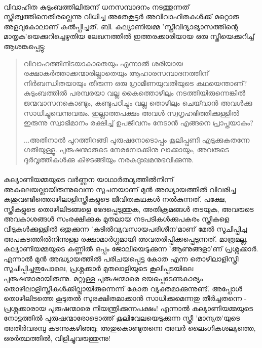 \paragraph{}വിവാഹിത കുടുംബത്തിലിരുന്ന് ധനസമ്പാദനം നടത്തുന്നത് സ്ത്രീത്വത്തിനെതിരല്ലെന്നു വിധിച്ച അതേകൂട്ടർ അവിവാഹിതകൾക്ക് മറ്റൊരു അളവുകോലാണ് കൽപ്പിച്ചത്. ബി. കല്യാണിയമ്മ 'സ്ത്രീവിദ്യാഭ്യാസത്തിന്റെ മാതൃക'യെക്കുറിച്ചെഴുതിയ ലേഖനത്തിൽ ഇത്തരക്കാരിയായ ഒരു സ്ത്രീയെക്കുറിച്ച് ആശങ്കപ്പെട്ടു:

\begin{quotation}
\noindent
വിവാഹത്തിനിടയാകാതെയും എന്നാൽ ശരിയായ രക്ഷാകർത്താക്കന്മാരില്ലാതെയും ആഹാരസമ്പാദനത്തിന് നിർബന്ധിതയായും തീരുന്ന ഒരു ഗ്രാമീണയുവതിയുടെ കഥയെന്താണ്? കുടുംബത്തിൽ പരമ്പരയാ വല്ല കൈത്തൊഴിലും നടത്തിയിരുന്നെങ്കിൽ ജന്മവാസനകൊണ്ടും, കണ്ടുപഠിച്ചും വല്ല തൊഴിലും ചെയ്‌വാൻ അവൾക്കു സാധിച്ചുവെന്നുവരും. ഇല്ലാത്തപക്ഷം അവൾ സ്വഗൃഹഭിത്തിക്കുള്ളിൽ ഇരുന്നു സ്വാഭിമാനം രക്ഷിച്ച് ഉപജീവനം നേടാൻ എങ്ങനെ പ്രാപ്തയാകും?

\noindent...അതിനാൽ പുറത്തിറങ്ങി പുരുഷനോടൊപ്പം കൂലിപ്പണി എടുക്കുകതന്നേ ഗതിയുള്ളൂ. പുരുഷന്മാരുടെ നേരമ്പോക്കിനു ലാക്കായും, അവരുടെ ദുർവൃത്തികൾക്കു കീഴടങ്ങിയും നരകദുഃഖമനുഭവിക്കുന്നു.
\end{quotation}

\paragraph{}കല്യാണിയമ്മയുടെ വർണ്ണന യാഥാർത്ഥ്യത്തിൽനിന്ന് അകലെയല്ലായിരുന്നുവെന്ന സൂചനയാണ് മുൻ അദ്ധ്യായത്തിൽ വിവരിച്ച കശുവണ്ടിത്തൊഴിലാളിസ്ത്രീകളുടെ ജീവിതകഥകൾ നൽകുന്നത്. പക്ഷേ, സ്ത്രീകളുടെ തൊഴിലിടങ്ങളെ ഭേദപ്പെടുത്തുക, അതിക്രമങ്ങൾ തടയുക, അവരുടെ അവകാശങ്ങൾ സംരക്ഷിക്കുക മുതലായ നടപടികൾക്കുപകരം സ്ത്രീകളെ വീടുകൾക്കുള്ളിൽ ഒതുക്കുന്ന 'കുടിൽവ്യവസായപരിശീന'മാണ് മേൽ സൂചിപ്പിച്ച അപകടത്തിൽനിന്നുള്ള രക്ഷാമാർഗ്ഗമായി അവതരിപ്പിക്കപ്പെടുന്നത്. മാത്രമല്ല, കല്യാണിയമ്മയുടെ കണ്ണിൽ ഒപ്പം ജോലിയെടുക്കുന്ന 'ആണുങ്ങളാ'ണ് പ്രശ്നക്കാർ. എന്നാൽ മുൻ അദ്ധ്യായത്തിൽ പരിചയപ്പെട്ട കോത എന്ന തൊഴിലാളിസ്ത്രീ സൂചിപ്പിച്ചതുപോലെ, പ്രശ്നക്കാർ മുതലാളിയുടെ കൂലിപ്പടയിലെ പുരുഷന്മാരായിരുന്നു. മറ്റുള്ള പുരുഷന്മാരെ ഭയപ്പെടേണ്ടകാര്യം തൊഴിലാളിസ്ത്രീകൾക്കില്ലായിരുന്നെന്ന് കോത വ്യക്തമാക്കുന്നുണ്ട്. അപ്പോൾ തൊഴിലിടത്തെ കൂടുതൽ സുരക്ഷിതമാക്കാൻ സാധിക്കുമെന്നതു തീർച്ചതന്നെ - പ്രശ്നക്കാരായ പുരുഷന്മാരെ നിയന്ത്രിക്കുന്നപക്ഷം! എന്നാൽ കല്യാണിയമ്മയുടെ നോട്ടത്തിൽ പുരുഷന്മാരോടൊത്ത് കൂലിവേലയെടുക്കുന്ന സ്ത്രീ 'മാന്യത'യുടെ അതിർവരമ്പു കടന്നുകഴിഞ്ഞു; അതുകൊണ്ടുതന്നെ അവർ ലൈംഗികശല്യത്തെ, ഒരർത്ഥത്തിൽ, വിളിച്ചുവരുത്തുന്നു!


